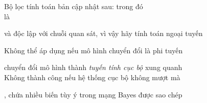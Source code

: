 \documentclass{article}
\begin{document}
\begin{huge}
Bộ lọc tính toán bản cập nhật sau:
\mat{\[
\begin{array}{rcl}
\mean_{t+1} &=& \kftm\mean_t + \kfgm_{t+1}(\z_{t+1} - \kfsm\kftm\mean_t)\\
\covariance_{t+1} &=& (\I-\kfgm_{t+1})(\kftm\covariance_t\kftm\transpose+\kftv)
\end{array}
\]}
trong đó \\
là 

 và  độc lập với chuỗi quan sát, vì vậy hãy tính toán ngoại tuyến







\vspace*{0.4in}

\maxfigwidth
{}


\vspace*{0.4in}

\maxfigwidth
{}





Không thể áp dụng nếu mô hình chuyển đổi là phi tuyến

 chuyển đổi mô hình thành \emph{tuyến tính cục bộ} xung quanh \\
Không thành công nếu hệ thống cục bộ không mượt mà

\vspace{0.2in}





,  chứa nhiều biến tùy ý trong mạng Bayes được sao chép


\end{huge}
\end{document}
